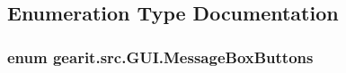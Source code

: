 \subsection{Enumeration Type Documentation}
\hypertarget{namespacegearit_1_1src_1_1_g_u_i_a142175becd6241f1b8c959354f0df291}{
\subsubsection[{Message\+Box\+Buttons}]{\setlength{\rightskip}{0pt plus 5cm}enum {\bf gearit.\+src.\+G\+U\+I.\+Message\+Box\+Buttons}}}\label{namespacegearit_1_1src_1_1_g_u_i_a142175becd6241f1b8c959354f0df291}

